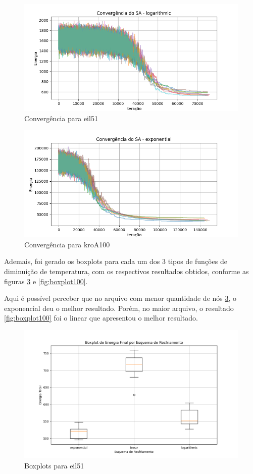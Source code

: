 \documentclass[12pt]{article}
\begin{document}
\begin{figure}[H]
  \centering
  \includegraphics[width=.9\textwidth]{imgs/convergence_51.png}
  \caption{Convergência para eil51}
  \label{fig:convergencia51}
  \end{figure}

\begin{figure}[H]
  \centering
  \includegraphics[width=.9\textwidth]{imgs/convergence_100.png}
  \caption{Convergência para kroA100}
  \label{fig:convergencia100}
   \end{figure}

Ademais, foi gerado os boxplots para cada um dos 3 tipos de funções de diminuição de temperatura, com os respectivos resultados obtidos, conforme as figuras \ref{fig:boxplot51} e \ref{fig:boxplot100}.

Aqui é possível perceber que no arquivo com menor quantidade de nós \ref{fig:boxplot51}, o exponencial deu o melhor resultado. 
Porém, no maior arquivo, o resultado \ref{fig:boxplot100} foi o linear que apresentou o melhor resultado.

\begin{figure}[H]
  \centering
  \includegraphics[width=.9\textwidth]{imgs/boxplot_51.png}
  \caption{Boxplots para eil51}
  \label{fig:boxplot51}
\end{figure}
\end{document}
